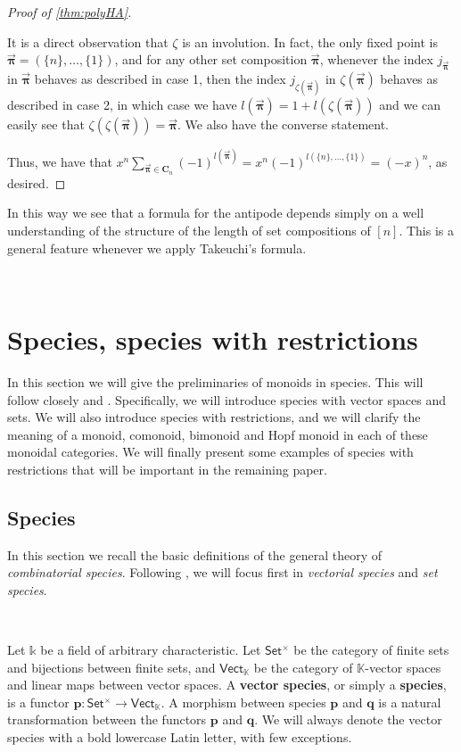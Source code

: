 \documentclass[12pt, reqno]{amsart}
\theoremstyle{definition}
\newcommand{\oPi}{\mathbf{C}}
\newcommand{\opi}{\vec{\boldsymbol{\pi}}}
\newcommand{\Fset}{\mathsf{Set^{\times}}}
\newcommand{\Vect}{\mathsf{Vect}}
\newcommand{\tp}{\mathbf{p}}
\newcommand{\tq}{\mathbf{q}}
\begin{document}
\begin{proof}[Proof of \cref{thm:polyHA}]
\begin{enumerate}
\end{enumerate}

It is a direct observation that $\zeta $ is an involution.
In fact, the only fixed point is $\opi = (\{n\}, \dots , \{1\})$, and for any other set composition $\opi$, whenever the index $j_{\opi}$ in $\opi $ behaves as described in case 1, then the index $j_{\zeta(\opi)}$ in $\zeta ( \opi ) $ behaves as described in case 2, in which case we have $l(\opi) = 1+l(\zeta (\opi))$ and we can easily see that $\zeta(\zeta(\opi )) = \opi$.
We also have the converse statement.

Thus, we have that $x^n \sum_{\opi \in \oPi_n} (-1)^{l(\opi)} = x^n (-1)^{l(\{n\}, \dots, \{1\} )}= (-x)^n$, as desired.
\end{proof}


In this way we see that a formula for the antipode depends simply on a well understanding of the structure of the length of set compositions of $[n]$.
This is a general feature whenever we apply Takeuchi's formula.





\

\section{Species, species with restrictions\label{sec:species}}


In this section we will give the preliminaries of monoids in species.
This will follow closely \cite{AM2010} and \cite{Schmitt1993}.
Specifically, we will introduce species with vector spaces and sets.
We will also introduce species with restrictions, and we will clarify the meaning of a monoid, comonoid, bimonoid and Hopf monoid in each of these monoidal categories.
We will finally present some examples of species with restrictions that will be important in the remaining paper. 

\subsection{Species}
In this section we recall the basic definitions of the general theory of \emph{combinatorial species}. Following \cite{AM2010}, we will focus first in \emph{vectorial species} and \emph{set species}.

\

Let $\mathbb{k}$ be a field of arbitrary characteristic. Let $\Fset$ be the category of finite sets and bijections between finite sets, and $\Vect_{\mathbb{K}}$ be the category of $\mathbb{K}$-vector spaces and linear maps between vector spaces. A {\bf vector species}, or simply a \textbf{species}, is a functor $\tp: \Fset \to \Vect_{\mathbb{K}}$. A morphism between species $\tp$ and $\tq$ is a natural transformation between the functors $\tp$ and $\tq$.
We will always denote the vector species with a bold lowercase Latin letter, with few exceptions.
\end{document}
